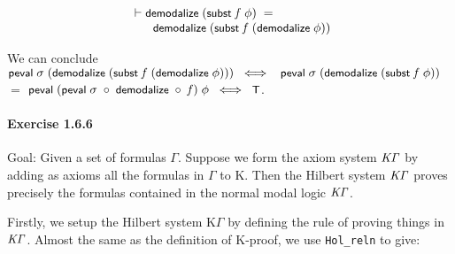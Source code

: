 \documentclass{report}
\renewcommand{\HOLConst}[1]{{\textsf{\upshape\small #1}}}
\renewcommand{\HOLinline}[1]{\ensuremath{#1}}
\newenvironment{holmath}{\begin{displaymath}\begin{array}{l}}{\end{array}\end{displaymath}\ignorespacesafterend}
\begin{document}
\begin{holmath}
  \ensuremath{\HOLTokenTurnstile}\HOLConst{demodalize}\;(\HOLConst{subst}\;\HOLFreeVar{f}\;\HOLFreeVar{\ensuremath{\phi}})\;\HOLSymConst{=}\\
\;\;\;\;\;\;\;\HOLConst{demodalize}\;(\HOLConst{subst}\;\HOLFreeVar{f}\;(\HOLConst{demodalize}\;\HOLFreeVar{\ensuremath{\phi}}))
\end{holmath}

We can conclude \HOLinline{\HOLConst{peval}\;\HOLFreeVar{\ensuremath{\sigma}}\;(\HOLConst{demodalize}\;(\HOLConst{subst}\;\HOLFreeVar{f}\;(\HOLConst{demodalize}\;\HOLFreeVar{\ensuremath{\phi}})))\;\HOLSymConst{\HOLTokenEquiv{}}\\
\;\;\HOLConst{peval}\;\HOLFreeVar{\ensuremath{\sigma}}\;(\HOLConst{demodalize}\;(\HOLConst{subst}\;\HOLFreeVar{f}\;\HOLFreeVar{\ensuremath{\phi}}))} $=$ \HOLinline{\HOLConst{peval}\;(\HOLConst{peval}\;\HOLFreeVar{\ensuremath{\sigma}}\;\HOLSymConst{\HOLTokenCompose}\;\HOLConst{demodalize}\;\HOLSymConst{\HOLTokenCompose}\;\HOLFreeVar{f})\;\HOLFreeVar{\ensuremath{\phi}}\;\HOLSymConst{\HOLTokenEquiv{}}\;\HOLConst{T}}.

  
\paragraph{Exercise 1.6.6}

Goal: Given a set of formulas $\Gamma$. Suppose we form the axiom system \HOLinline{\HOLFreeVar{K\ensuremath{\Gamma}}} by adding as axioms all the formulas in $\Gamma$ to K. Then the Hilbert system \HOLinline{\HOLFreeVar{K\ensuremath{\Gamma}}} proves precisely the formulas contained in the normal modal logic \HOLinline{\HOLFreeVar{K\ensuremath{\Gamma}}}.

Firstly, we setup the Hilbert system K$\Gamma$ by defining the rule of proving things in \HOLinline{\HOLFreeVar{K\ensuremath{\Gamma}}}. Almost the same as the definition of K-proof, we use \texttt{Hol_reln} to give:
\end{document}
